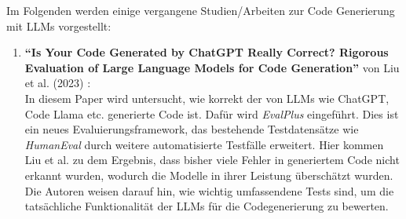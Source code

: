 \documentclass[11pt,a4paper]{article}
\begin{document}
Im Folgenden werden einige vergangene Studien/Arbeiten zur Code Generierung mit LLMs vorgestellt:
\begin{enumerate}
    \item \textbf{``Is Your Code Generated by ChatGPT Really Correct? Rigorous Evaluation of Large Language Models for Code Generation''} von Liu et al. (2023) \cite{NEURIPS2023_43e9d647}:\\
    In diesem Paper wird untersucht, wie korrekt der von LLMs wie ChatGPT, Code Llama etc. generierte Code ist. Dafür wird \emph{EvalPlus} eingeführt. Dies ist ein neues Evaluierungsframework, das bestehende Testdatensätze wie \emph{HumanEval} durch weitere automatisierte Testfälle erweitert. Hier kommen Liu et al. zu dem Ergebnis, dass bisher viele Fehler in generiertem Code nicht erkannt wurden, wodurch die Modelle in ihrer Leistung überschätzt wurden. Die Autoren weisen darauf hin, wie wichtig umfassendene Tests sind, um die tatsächliche Funktionalität der LLMs für die Codegenerierung zu bewerten.


\end{enumerate}
\end{document}
